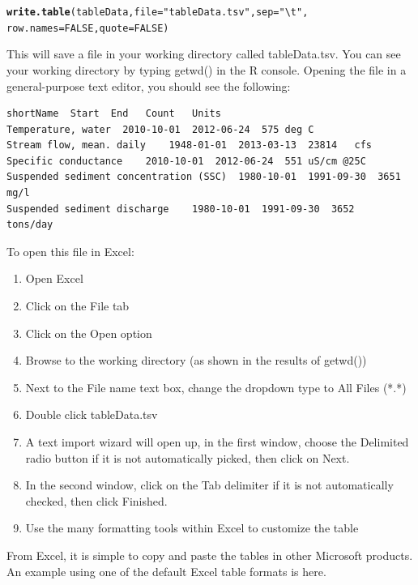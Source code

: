 \documentclass[a4paper,11pt]{article}\usepackage[]{graphicx}\usepackage[]{color}
\makeatletter
\newcommand{\hlnum}[1]{\textcolor[rgb]{0.686,0.059,0.569}{#1}}%
\newcommand{\hlstr}[1]{\textcolor[rgb]{0.192,0.494,0.8}{#1}}%
\newcommand{\hlstd}[1]{\textcolor[rgb]{0.345,0.345,0.345}{#1}}%
\newcommand{\hlkwc}[1]{\textcolor[rgb]{0.333,0.667,0.333}{#1}}%
\newcommand{\hlkwd}[1]{\textcolor[rgb]{0.737,0.353,0.396}{\textbf{#1}}}%
\newenvironment{kframe}{%
 \def\at@end@of@kframe{}%
 \ifinner\ifhmode%
  \def\at@end@of@kframe{\end{minipage}}%
  \begin{minipage}{\columnwidth}%
 \fi\fi%
 \def\FrameCommand##1{\hskip\@totalleftmargin \hskip-\fboxsep
 \colorbox{shadecolor}{##1}\hskip-\fboxsep
     \hskip-\linewidth \hskip-\@totalleftmargin \hskip\columnwidth}%
 \MakeFramed {\advance\hsize-\width
   \@totalleftmargin\z@ \linewidth\hsize
   \@setminipage}}%
 {\par\unskip\endMakeFramed%
 \at@end@of@kframe}
\newenvironment{knitrout}{}{} %
\makeatother
\begin{document}
\begin{knitrout}
\color{fgcolor}\begin{kframe}
\begin{alltt}
\hlkwd{write.table}\hlstd{(tableData,} \hlkwc{file}\hlstd{=}\hlstr{"tableData.tsv"}\hlstd{,}\hlkwc{sep}\hlstd{=}\hlstr{"\textbackslash{}t"}\hlstd{,}
            \hlkwc{row.names} \hlstd{=} \hlnum{FALSE}\hlstd{,}\hlkwc{quote}\hlstd{=}\hlnum{FALSE}\hlstd{)}
\end{alltt}
\end{kframe}
\end{knitrout}


This will save a file in your working directory called tableData.tsv.  You can see your working directory by typing getwd() in the R console. Opening the file in a general-purpose text editor, you should see the following:

\begin{verbatim}
shortName  Start  End	Count	Units
Temperature, water	2010-10-01	2012-06-24	575	deg C
Stream flow, mean. daily	1948-01-01	2013-03-13	23814	cfs
Specific conductance	2010-10-01	2012-06-24	551	uS/cm @25C
Suspended sediment concentration (SSC)	1980-10-01	1991-09-30	3651	mg/l
Suspended sediment discharge	1980-10-01	1991-09-30	3652	tons/day
\end{verbatim}

To open this file in Excel:
\begin{enumerate}
\item Open Excel
\item Click on the File tab
\item Click on the Open option
\item Browse to the working directory (as shown in the results of getwd())
\item Next to the File name text box, change the dropdown type to All Files (*.*)
\item Double click tableData.tsv
\item A text import wizard will open up, in the first window, choose the Delimited radio button if it is not automatically picked, then click on Next.
\item In the second window, click on the Tab delimiter if it is not automatically checked, then click Finished.
\item Use the many formatting tools within Excel to customize the table
\end{enumerate}

From Excel, it is simple to copy and paste the tables in other Microsoft products. An example using one of the default Excel table formats is here.
\end{document}
